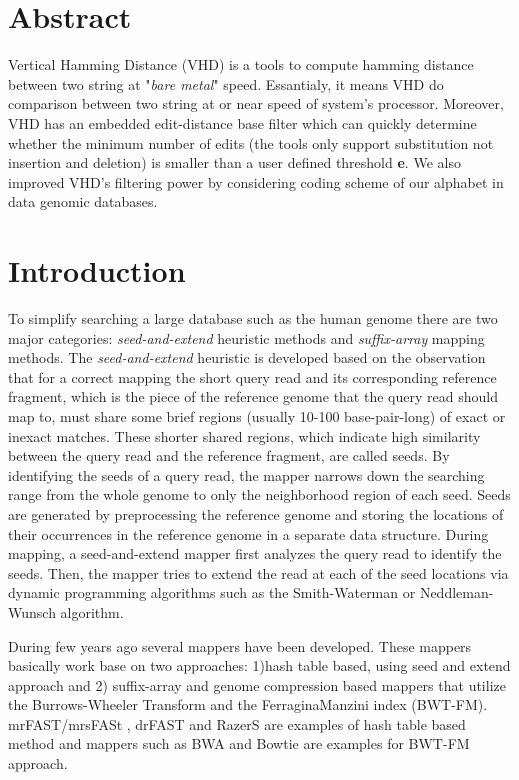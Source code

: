 \section{Abstract}
Vertical Hamming Distance (VHD) is a tools to compute hamming distance between two string at "\textit{bare metal}" speed. Essantialy, it means VHD do comparison between two string at or near speed of system's processor. Moreover, VHD has an embedded edit-distance base filter which can quickly determine whether the minimum number of edits (the tools only support substitution not insertion and deletion) is smaller than a user defined threshold \textbf{e}. We also improved VHD's filtering power by considering coding scheme of our alphabet in data genomic databases.

\section{Introduction}
To simplify searching a large database such as the human genome there are two major categories: \emph{seed-and-extend} heuristic methods and \emph{suffix-array} mapping methods. The \emph{seed-and-extend} heuristic is developed based on the observation that for a correct mapping the short query read and its corresponding reference fragment, which is the piece of the reference genome that the query read should map to, must share some brief regions (usually 10-100 base-pair-long) of exact or inexact matches. These shorter shared regions, which indicate high similarity between the query read and the reference fragment, are called seeds. By identifying the seeds of a query read, the mapper narrows down the searching range from the whole genome to only the neighborhood region of each seed. Seeds are generated by preprocessing the reference genome and storing the locations of their occurrences in the reference genome in a separate data structure. During mapping, a seed-and-extend mapper first analyzes the query read to identify the seeds. Then, the mapper tries to extend the read at each of the seed locations via dynamic programming algorithms such as the Smith-Waterman \cite{smith1981identification} or Neddleman-Wunsch \citep{needleman} algorithm.

During few years ago several mappers have been developed. These mappers basically work base on two approaches: 1)hash table based, using seed and extend approach and 2) suffix-array and genome compression based mappers that utilize the Burrows-Wheeler Transform and the FerraginaManzini index (BWT-FM).  mrFAST/mrsFASt \cite{mrfast}\cite{mrsfast}, drFAST\cite{drfast} and RazerS\cite{razers} are examples of hash table based method and mappers such as BWA\cite{bwa} and Bowtie\cite{bowtie} are examples for BWT-FM approach. 

